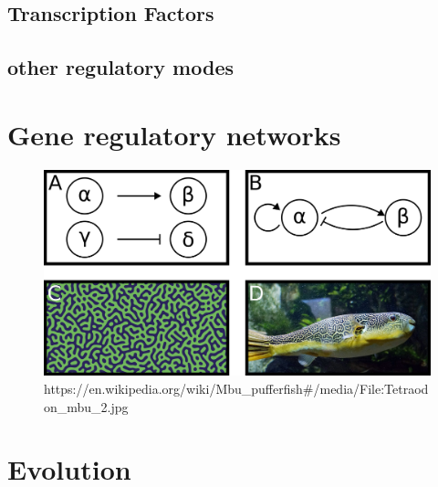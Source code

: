 \subsection{Transcription Factors}


\subsection{other regulatory modes}
\section{Gene regulatory networks}

\begin{figure}[H]
    \includegraphics[width=\linewidth]{ch1.Introduction/imgs/network.png}
    \caption{https://en.wikipedia.org/wiki/Mbu\_pufferfish\#/media/File:Tetraodon\_mbu\_2.jpg}
    \label{fig:network}
\end{figure}

\section{Evolution}

